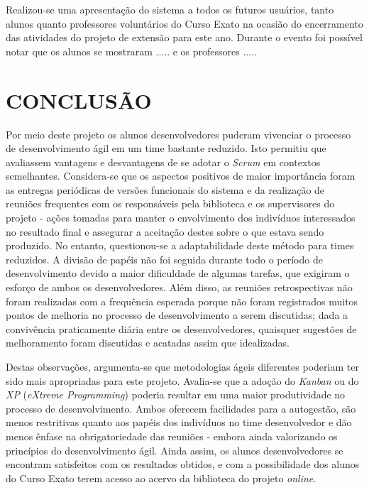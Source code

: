 \documentclass[a4paper]{article}
\begin{document}
Realizou-se uma apresentação do sistema a todos os futuros usuários, tanto alunos quanto professores voluntários do Curso Exato na ocasião do encerramento das atividades do projeto de extensão para este ano. Durante o evento foi possível notar que os alunos se mostraram ..... e os professores .....

\pagebreak
\section{CONCLUSÃO}
Por meio deste projeto os alunos desenvolvedores puderam vivenciar o processo de desenvolvimento ágil em um time bastante reduzido. Isto permitiu que avaliassem vantagens e desvantagens de se adotar o \textit{Scrum} em contextos semelhantes. Considera-se que os aspectos positivos de maior importância foram as entregas periódicas de versões funcionais do sistema e da realização de reuniões frequentes com os responsáveis pela biblioteca e os supervisores do projeto - ações tomadas para manter o envolvimento dos indivíduos interessados no resultado final e assegurar a aceitação destes sobre o que estava sendo produzido. No entanto, questionou-se a adaptabilidade deste método para times reduzidos. A divisão de papéis não foi seguida durante todo o período de desenvolvimento devido a maior dificuldade de algumas tarefas, que exigiram o esforço de ambos os desenvolvedores. Além disso, as reuniões retrospectivas não foram realizadas com a frequência esperada porque não foram registrados muitos pontos de melhoria no processo de desenvolvimento a serem discutidas; dada a convivência praticamente diária entre os desenvolvedores, quaisquer sugestões de melhoramento foram discutidas e acatadas assim que idealizadas.

Destas observações, argumenta-se que metodologias ágeis diferentes poderiam ter sido mais apropriadas para este projeto. Avalia-se que a adoção do \textit{Kanban} \cite{kanban} ou do \textit{XP} (\textit{eXtreme Programming}) \cite{xp} poderia resultar em uma maior produtividade no processo de desenvolvimento. Ambos oferecem facilidades para a autogestão, são menos restritivas quanto aos papéis dos indivíduos no time desenvolvedor e dão menos ênfase na obrigatoriedade das reuniões - embora ainda valorizando os princípios do desenvolvimento ágil. Ainda assim, os alunos desenvolvedores se encontram satisfeitos com os resultados obtidos, e com a possibilidade dos alunos do Curso Exato terem acesso ao acervo da biblioteca do projeto \textit{online}.
\end{document}
